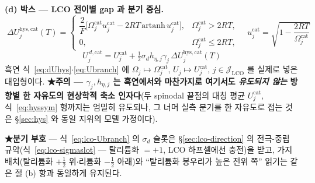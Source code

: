 \documentclass[11pt,a4paper]{article}
\newcommand{\hys}{\mathrm{hys}}
\begin{document}
\textbf{(d) 박스 — LCO 전이별 gap 과 분기 중심.}
\begin{equation}
\boxed{\;
\Delta U_j^{\hys,\mathrm{cat}}(T)=
\begin{cases}
\dfrac{2}{F}\big[\Omega_j^\mathrm{cat}u_j^\mathrm{cat}-2RT\,\mathrm{artanh}\,u_j^\mathrm{cat}\big],
& \Omega_j^\mathrm{cat}>2RT,\\[4pt]
0, & \Omega_j^\mathrm{cat}\le2RT,
\end{cases}
\quad u_j^\mathrm{cat}=\sqrt{1-\dfrac{2RT}{\Omega_j^\mathrm{cat}}}\;}
\label{eq:lco-dUhys}
\end{equation}
\begin{equation}
\boxed{\;
U_j^{\,d,\mathrm{cat}}=U_j^\mathrm{cat}
+\tfrac12\sigma_d h_{\eta,j}\gamma_j\,\Delta U_j^{\hys,\mathrm{cat}}(T)\;}
\label{eq:lco-Ubranch}
\end{equation}
흑연 식~\eqref{eq:dUhys}$\cdot$\eqref{eq:Ubranch} 에 $\Omega_j\mapsto\Omega_j^\mathrm{cat}$,
$U_j\mapsto U_j^\mathrm{cat}$, $j\in\mathcal J_\mathrm{LCO}$ 를 실제로 넣은 대입형이다. \textbf{★주의 — $\gamma_j,h_{\eta,j}$ 는 흑연에서와 마찬가지로 여기서도
\emph{유도되지 않는} 방향별 한 자유도의 현상학적 축소 인자다}(두 spinodal 끝점의 대칭 평균
$U_j^\mathrm{cat}$, 식~\eqref{eq:hyssym} 형까지는 엄밀히 유도되나, 그 너머 실측 분기를 한 자유도로 접는
것은 \S\ref{sec:hys} 와 동일 지위의 모델 가정이다).

\textbf{★분기 부호} — 식~\eqref{eq:lco-Ubranch} 의 $\sigma_d$ 슬롯은 \S\ref{sec:lco-direction} 의 전극-중립
규약(식~\eqref{eq:lco-sigmaslot} --- 탈리튬화 $=+1$, LCO 하프셀에선 충전)을 받고, 가지 배치(탈리튬화
$+\tfrac12$ 위$\cdot$리튬화 $-\tfrac12$ 아래)와 ``탈리튬화 봉우리가 높은 전위 쪽'' 읽기는 같은 절 (b) 항과
동일하게 유지된다.
\end{document}
